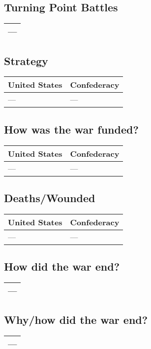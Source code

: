 \documentclass{article}
\begin{document}
\subsection{Turning Point Battles}
\begin{tabular}{|p{14cm}|}
    \hline
    ---
    \\
    \hline
\end{tabular}

\subsection{Strategy}
\begin{tabular}{|p{7cm}|p{7cm}|}
    \hline
    United States & Confederacy \\
    \hline
    ---
    &
    ---
    \\
    \hline
\end{tabular}

\subsection{How was the war funded?}
\begin{tabular}{|p{7cm}|p{7cm}|}
    \hline
    United States & Confederacy \\
    \hline
    ---
    &
    ---
    \\
    \hline
\end{tabular}

\subsection{Deaths/Wounded}
\begin{tabular}{|p{7cm}|p{7cm}|}
    \hline
    United States & Confederacy \\
    \hline
    ---
    &
    ---
    \\
    \hline
\end{tabular}

\subsection{How did the war end?}
\begin{tabular}{|p{14cm}|}
    \hline
    ---
    \\
    \hline
\end{tabular}

\subsection{Why/how did the war end?}
\begin{tabular}{|p{14cm}|}
    \hline
    ---
    \\
    \hline
\end{tabular}
\end{document}
